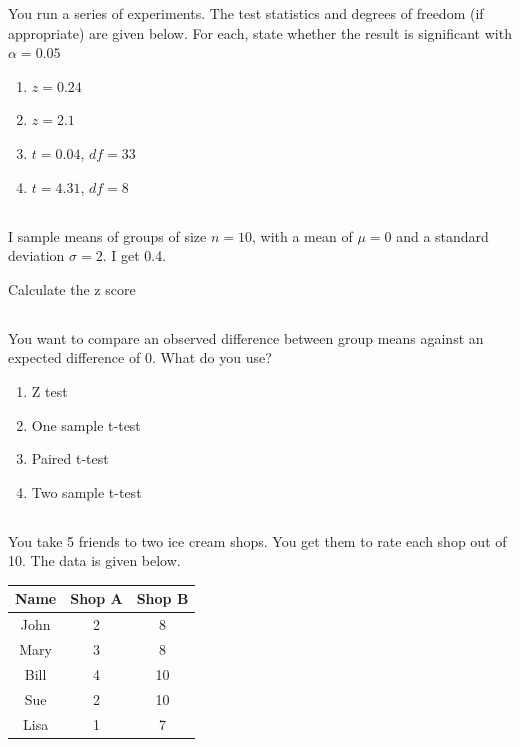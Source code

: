 \documentclass[twocolumn]{article}
\begin{document}
You run a series of experiments. The test statistics and degrees of freedom (if appropriate) are given below. For each, state whether the result is significant with $\alpha = 0.05$

\begin{enumerate}
    \item $z = 0.24 $
    \item $z = 2.1 $
    \item $t = 0.04$, $df = 33$
    \item $t = 4.31$, $df = 8$
\end{enumerate}

\subsection{}

I sample means of groups of size $n = 10$, with a mean of $\mu = 0$ and a standard deviation $\sigma = 2$. I get 0.4.

Calculate the z score

\subsection{}

You want to compare an observed difference between group means against an expected difference of 0. What do you use?

\begin{enumerate}
    \item Z test
    \item One sample t-test
    \item Paired t-test
    \item Two sample t-test
\end{enumerate}

\subsection{}

You take 5 friends to two ice cream shops. You get them to rate each shop out of 10. The data is given below.

\begin{table}[h!]
    \centering
    \begin{tabular}{c | c | c }
        \toprule
        Name & Shop A & Shop B \\
        \midrule
        John & 2 & 8  \\
        Mary & 3 & 8  \\
        Bill & 4 & 10 \\
        Sue & 2 & 10 \\
        Lisa & 1 & 7 \\
        \bottomrule
    \end{tabular}
\end{table}
\end{document}
